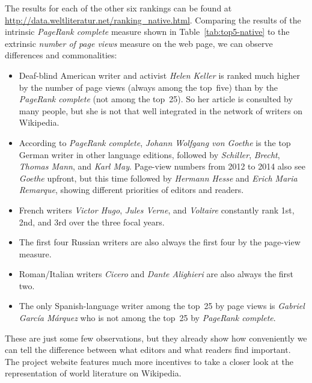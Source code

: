 \documentclass[a4paper,12pt]{scrartcl}
\begin{document}
The results for each of the other six rankings can be found at
\url{http://data.weltliteratur.net/ranking_native.html}.
%
Comparing the results of the intrinsic \emph{PageRank complete}
measure shown in Table~\ref{tab:top5-native} to the extrinsic
\emph{number of page views} measure on the web page, we can observe
differences and commonalities:
\begin{itemize}
\item Deaf-blind American writer and activist \emph{Helen Keller} is
  ranked much higher by the number of page views (always among the
  top~five) than by the \emph{PageRank complete} (not among the
  top~25). So her article is consulted by many people,
  but she is not that well integrated in the network of
  writers on Wikipedia.
\item According to \emph{PageRank complete}, \emph{Johann Wolfgang von
    Goethe} is the top German writer in other language editions,
  followed by \emph{Schiller}, \emph{Brecht}, \emph{Thomas Mann}, and
  \emph{Karl May}.  Page-view numbers from 2012 to 2014 also see
  \emph{Goethe} upfront, but this time followed by \emph{Hermann
    Hesse} and \emph{Erich Maria Remarque}, showing different
  priorities of editors and readers.
\item French writers \emph{Victor Hugo}, \emph{Jules Verne}, and
  \emph{Voltaire} constantly rank 1st, 2nd, and 3rd over the
  three focal years.
\item The first four Russian writers are also always the first four by
  the page-view measure.
\item Roman/Italian writers \emph{Cicero} and \emph{Dante Alighieri}
  are also always the first two.
\item The only Spanish-language writer among the top~25 by page views is
  \emph{Gabriel García Márquez} who is not among the top~25 by
  \emph{PageRank complete}.
\end{itemize}
%
These are just some few observations, but they already show how
conveniently we can tell the difference between what editors and what
readers find important. The project website features much more
incentives to take a closer look at the representation of world
literature on Wikipedia.






\end{document}
